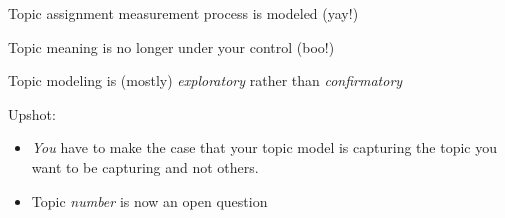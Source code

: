 \documentclass[11pt,compress,professionalfonts]{beamer}
\newcommand{\ita}{\begin{itemize}}
\newcommand{\itm}{\item[]}
\newcommand{\itz}{\end{itemize}}
\begin{document}
%
%
%
%
%
%
%
%
% 
%
%
%
%
%
%
%
%
%
%
%
%
%
%
%
%
%




Topic assignment measurement process is modeled  (yay!)

Topic meaning is no longer under your control (boo!)

Topic modeling is (mostly) \textit{exploratory} rather than \textit{confirmatory}

Upshot: 
\ita
\itm \textit{You} have to make the case that your topic model is capturing the topic you want to be capturing and not others.
\itm Topic \textit{number} is now an open question
\itz

\end{document}
